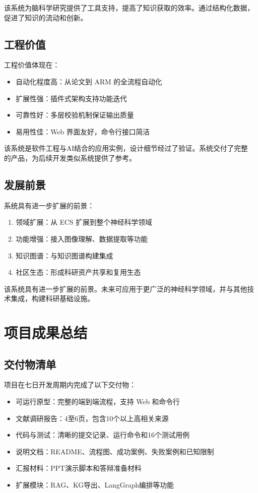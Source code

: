 ﻿\documentclass[a4paper,12pt]{article}
\begin{document}
该系统为脑科学研究提供了工具支持，提高了知识获取的效率。通过结构化数据，促进了知识的流动和创新。

\subsection{工程价值}

工程价值体现在：

\begin{itemize}
    \item 自动化程度高：从论文到 ARM 的全流程自动化
    \item 扩展性强：插件式架构支持功能迭代
    \item 可靠性好：多层校验机制保证输出质量
    \item 易用性佳：Web 界面友好，命令行接口简洁
\end{itemize}

该系统是软件工程与AI结合的应用实例，设计细节经过了验证。系统交付了完整的产品，为后续开发类似系统提供了参考。

\subsection{发展前景}

系统具有进一步扩展的前景：

\begin{enumerate}
    \item 领域扩展：从 ECS 扩展到整个神经科学领域
    \item 功能增强：接入图像理解、数据提取等功能
    \item 知识图谱：与知识图谱构建集成
    \item 社区生态：形成科研资产共享和复用生态
\end{enumerate}

该系统具有进一步扩展的前景。未来可应用于更广泛的神经科学领域，并与其他技术集成，构建科研基础设施。

\section{项目成果总结}

\subsection{交付物清单}

项目在七日开发周期内完成了以下交付物：

\begin{itemize}
    \item 可运行原型：完整的端到端流程，支持 Web 和命令行
    \item 文献调研报告：4至6页，包含10个以上高相关来源
    \item 代码与测试：清晰的提交记录、运行命令和16个测试用例
    \item 说明文档：README、流程图、成功案例、失败案例和已知限制
    \item 汇报材料：PPT演示脚本和答辩准备材料
    \item 扩展模块：RAG、KG导出、LangGraph编排等功能
\end{itemize}
\end{document}
